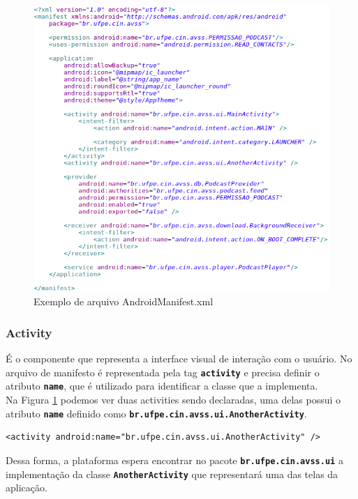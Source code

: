 \documentclass[a4paper,12pt]{article}
\begin{document}
 \begin{figure}[h]
 \centering
 \includegraphics[width=\linewidth]{imgs/manifest.png}
 \caption{Exemplo de arquivo AndroidManifest.xml}
 \label{fig:manifest}
 \end{figure}



\subsubsection{Activity}
É o componente que representa a interface visual de interação com o usuário. No arquivo de manifesto é representada pela tag {\small\texttt{\textbf{activity}}} e precisa definir o atributo {\small\texttt{\textbf{name}}}, que é utilizado para identificar a classe que a implementa.\\

Na Figura \ref{fig:manifest} podemos ver duas activities sendo declaradas, uma delas possui o atributo {\small\texttt{\textbf{name}}} definido como {\small\texttt{\textbf{br.ufpe.cin.avss.ui.AnotherActivity}}}.
{\fontsize{9pt}{12pt}
\begin{Verbatim}
<activity android:name="br.ufpe.cin.avss.ui.AnotherActivity" />
\end{Verbatim}
}

Dessa forma, a plataforma espera encontrar no pacote {\small\texttt{\textbf{br.ufpe.cin.avss.ui}}} a implementação da classe {\small\textbf{\texttt{AnotherActivity}}} que representará uma das telas da aplicação.
\end{document}

